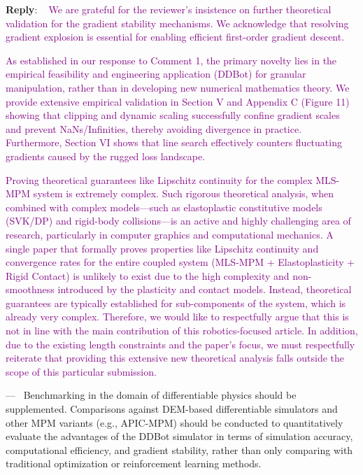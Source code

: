 \documentclass[11pt]{article}
\newcounter{reviewer}
\newcounter{point}[reviewer]
\renewcommand{\thepoint}{P\,\thereviewer.\arabic{point}}
\newenvironment{point}
   {\refstepcounter{point} \bigskip \noindent {\textbf{Reviewer~Point~\thepoint} } ---\ }
   {\par }
\newenvironment{reply}
   {\medskip \noindent \begin{sf}\textbf{Reply}: \  }
   {\medskip \end{sf}}
\newcommand{\rp}[1]{\textcolor{purple}{#1}}
\begin{document}
\begin{reply}
\rp{We are grateful for the reviewer’s insistence on further theoretical validation for the gradient stability mechanisms. We acknowledge that resolving gradient explosion is essential for enabling efficient first-order gradient descent.}

\rp{As established in our response to Comment 1, the primary novelty lies in the empirical feasibility and engineering application (DDBot) for granular manipulation, rather than in developing new numerical mathematics theory. We provide extensive empirical validation in Section V and Appendix C (Figure 11) showing that clipping and dynamic scaling successfully confine gradient scales and prevent NaNs/Infinities, thereby avoiding divergence in practice. Furthermore, Section VI shows that line search effectively counters fluctuating gradients caused by the rugged loss landscape.}

\rp{Proving theoretical guarantees like Lipschitz continuity for the complex MLS-MPM system is extremely complex. Such rigorous theoretical analysis, when combined with complex models—such as elastoplastic constitutive models (SVK/DP) and rigid-body collisions—is an active and highly challenging area of research, particularly in computer graphics and computational mechanics. A single paper that formally proves properties like Lipschitz continuity and convergence rates for the entire coupled system (MLS-MPM + Elastoplasticity + Rigid Contact) is unlikely to exist due to the high complexity and non-smoothness introduced by the plasticity and contact models. Instead, theoretical guarantees are typically established for sub-components of the system, which is already very complex. Therefore, we would like to respectfully argue that this is not in line with the main contribution of this robotics-focused article. In addition, due to the existing length constraints and the paper's focus, we must respectfully reiterate that providing this extensive new theoretical analysis falls outside the scope of this particular submission.}
\end{reply}

\begin{point}
Benchmarking in the domain of differentiable physics should be
supplemented. Comparisons against DEM-based differentiable simulators
and other MPM variants (e.g., APIC-MPM) should be conducted to
quantitatively evaluate the advantages of the DDBot simulator in terms
of simulation accuracy, computational efficiency, and gradient
stability, rather than only comparing with traditional optimization or
reinforcement learning methods.
\end{point}
\end{document}
